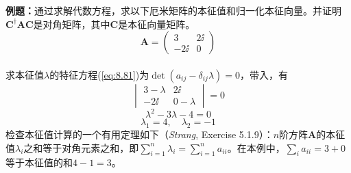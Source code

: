     \begin{examplebox}
        \textbf{例题：}通过求解代数方程，求以下厄米矩阵的本征值和归一化本征向量。并证明$\mathbf{C}^{\dagger}\mathbf{A}\mathbf{C}$是对角矩阵，其中$\mathbf{C}$是本征向量矩阵。
        \begin{equation*}
            \mathbf{A} = \begin{pmatrix}
                3 & 2\ii \\
                -2\ii & 0
            \end{pmatrix}
        \end{equation*}
        \\

        求本征值$\lambda$的特征方程(\ref{eq:8.81})为$\det(a_{ij} - \delta_{ij}\lambda) = 0$，带入，有
        \begin{equation*}
            \begin{vmatrix}
                3 - \lambda & 2\ii \\
                -2\ii & 0 - \lambda
            \end{vmatrix} = 0
        \end{equation*}
        \begin{equation*}
            \lambda^2 - 3\lambda - 4 = 0
        \end{equation*}
        \begin{equation*}
            \lambda_1 = 4, \quad \lambda_2 = -1
        \end{equation*}
        检查本征值计算的一个有用定理如下（\textit{Strang}, Exercise 5.1.9）：$n$阶方阵$\mathbf{A}$的本征值$\lambda_i$之和等于对角元素之和，即$\sum_{i=1}^{n}\lambda_i = \sum_{i=1}^{n}a_{ii}$。在本例中，$\sum_i a_{ii} = 3 + 0$等于本征值的和$4 - 1 = 3$。


\end{examplebox}

